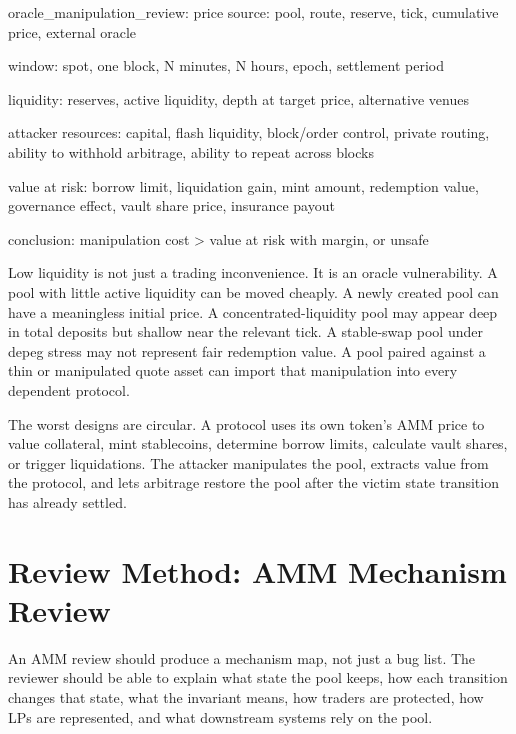 \begin{codeblock}
oracle_manipulation_review:
    price source:
        pool, route, reserve, tick, cumulative price, external oracle

    window:
        spot, one block, N minutes, N hours, epoch, settlement period

    liquidity:
        reserves, active liquidity, depth at target price, alternative venues

    attacker resources:
        capital, flash liquidity, block/order control, private routing,
        ability to withhold arbitrage, ability to repeat across blocks

    value at risk:
        borrow limit, liquidation gain, mint amount, redemption value,
        governance effect, vault share price, insurance payout

    conclusion:
        manipulation cost > value at risk with margin, or unsafe
\end{codeblock}

Low liquidity is not just a trading inconvenience. It is an oracle vulnerability. A pool with little active liquidity can be moved cheaply. A newly created pool can have a meaningless initial price. A concentrated-liquidity pool may appear deep in total deposits but shallow near the relevant tick. A stable-swap pool under depeg stress may not represent fair redemption value. A pool paired against a thin or manipulated quote asset can import that manipulation into every dependent protocol.

The worst designs are circular. A protocol uses its own token's AMM price to value collateral, mint stablecoins, determine borrow limits, calculate vault shares, or trigger liquidations. The attacker manipulates the pool, extracts value from the protocol, and lets arbitrage restore the pool after the victim state transition has already settled.

\section{Review Method: AMM Mechanism Review}

An AMM review should produce a mechanism map, not just a bug list. The reviewer should be able to explain what state the pool keeps, how each transition changes that state, what the invariant means, how traders are protected, how LPs are represented, and what downstream systems rely on the pool.


